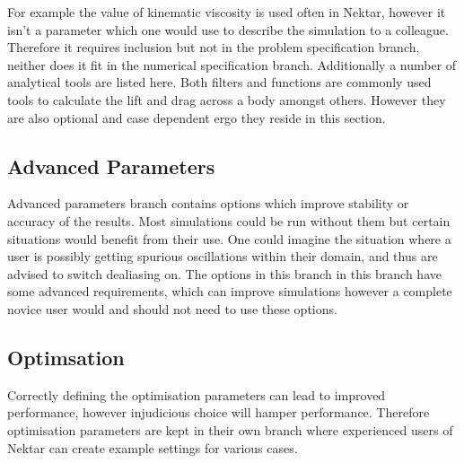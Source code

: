 \documentclass[11pt, a4paper]{report}
\begin{document}
For example the value of kinematic viscosity is used often in Nektar, however it isn't a parameter which one would use to describe the simulation to a colleague. Therefore it requires inclusion but not in the problem specification branch, neither does it fit in the numerical specification branch. Additionally a number of analytical tools are listed here. Both filters and functions are commonly used tools to calculate the lift and drag across a body amongst others. However they are also optional and case dependent ergo they reside in this section.

\subsection{Advanced Parameters}
Advanced parameters branch contains options which improve stability or accuracy of the results. Most simulations could be run without them but certain situations would benefit from their use. One could imagine the situation where a user is possibly getting spurious oscillations within their domain, and thus are advised to switch dealiasing on. The options in this branch in this branch have some advanced requirements, which can improve simulations however a complete novice user would and should not need to use these options.

\subsection{Optimsation}
Correctly defining the optimisation parameters can lead to improved performance, however injudicious choice will hamper performance. Therefore optimisation parameters are kept in their own branch where experienced users of Nektar can create example settings for various cases.
\end{document}
